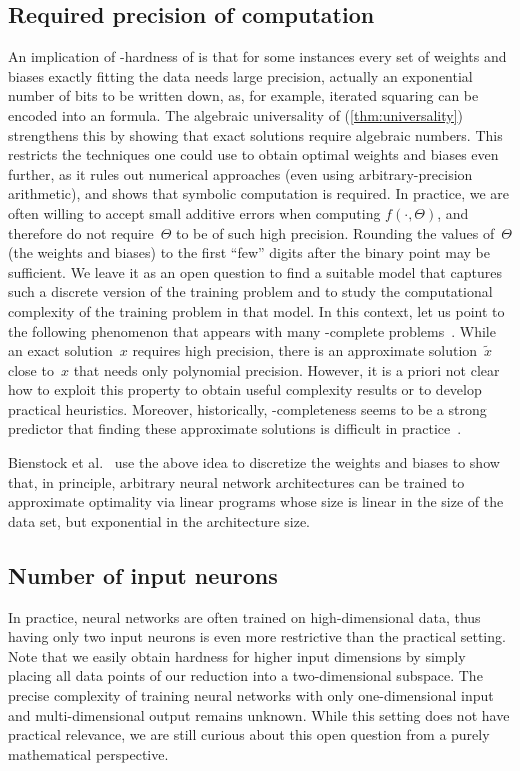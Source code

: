 \subsection{Required precision of computation}
An implication of \ER-hardness of \trainNN is that for some instances every set of 
weights and biases 
exactly fitting the data %
%
needs large precision, actually %
%
an exponential
%
number of bits to be written down,
%
as, for example, iterated squaring can be encoded into an \ETR formula.
%
%
%
%
The algebraic universality of \trainNN (\cref{thm:universality}) strengthens this
by showing that exact solutions require algebraic numbers.
This restricts the techniques one could use to obtain optimal weights and biases even further,
as it rules out numerical approaches (even using arbitrary-precision arithmetic), and shows
that symbolic computation is required.
In practice, we are often willing to accept small additive errors when computing $f(\cdot, \Theta)$,
and therefore do not require~$\Theta$ %
to be %
of such high precision.
Rounding %
the values of~$\Theta$ (the weights and biases) %
to the first \enquote{few} digits after the %
%
binary point  %
may be sufficient.
%
%
%
%
%
%
%
%
%
%
%
%
%
%
We leave it as an open question to find a suitable model that captures such a discrete version of the training problem and to study the computational complexity of the training problem in that model. In this context, let us point to the following phenomenon that appears with many \ER-complete problems~\cite{Erickson2022_SmoothingTheGap}.
%
%
While an exact solution~$x$ requires high precision, there is an approximate solution~$\tilde{x}$
close to~$x$ that needs only polynomial precision.
However, %
%
it is a priori not clear how to exploit this property to obtain useful complexity results or to develop practical heuristics.
%
%
%
%
%
%
%
%
%
%
Moreover, historically, \ER-completeness seems to be a strong predictor that finding these approximate solutions is difficult in practice~\cite{Deligkas2022_ApproximatingETR, Erickson2022_SmoothingTheGap}.

Bienstock et al.~\cite{Bienstock2023_LinearProgramming} use the above idea to discretize the weights and biases to show that, in principle, arbitrary neural network architectures can be trained to approximate optimality via linear programs whose
%
size is %
linear in the size of the data set, but exponential in the architecture size.
%
%
%
%
%
%
%
%
%

\subsection{Number of input neurons}
In practice, neural networks are often trained on 
%
high-dimensional  %
data, thus having only two input neurons is even more restrictive than the practical setting.
Note that we easily obtain hardness for higher input dimensions by simply placing all data points of our reduction into a two-dimensional subspace.
The precise complexity of training \fullyconnected \twolayer neural networks with only one-dimensional input and multi-dimensional output remains unknown.
While this setting does not have practical relevance, we are still curious about this open question from a purely mathematical perspective.

